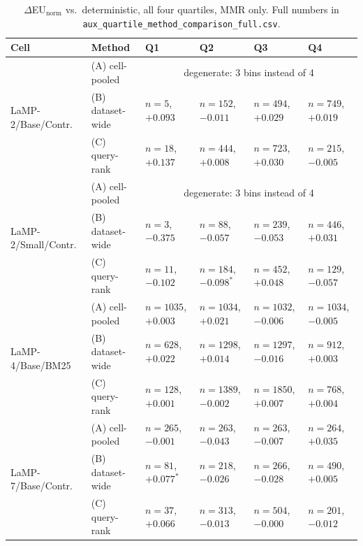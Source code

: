 \documentclass[10pt]{article}
\begin{document}
\begin{table}[h]
\centering
\scriptsize
\begin{tabular}{@{}llllll@{}}
\toprule
Cell & Method & Q1 & Q2 & Q3 & Q4 \\
\midrule
\multirow{3}{*}{LaMP-2/Base/Contr.} & (A) cell-pooled & \multicolumn{4}{c}{degenerate: 3 bins instead of 4} \\
 & (B) dataset-wide & $n{=}5$, $+0.093$ & $n{=}152$, $-0.011$ & $n{=}494$, $+0.029$ & $n{=}749$, $+0.019$ \\
 & (C) query-rank & $n{=}18$, $+0.137$ & $n{=}444$, $+0.008$ & $n{=}723$, $+0.030$ & $n{=}215$, $-0.005$ \\
\cmidrule(lr){1-6}
\multirow{3}{*}{LaMP-2/Small/Contr.} & (A) cell-pooled & \multicolumn{4}{c}{degenerate: 3 bins instead of 4} \\
 & (B) dataset-wide & $n{=}3$, $-0.375$ & $n{=}88$, $-0.057$ & $n{=}239$, $-0.053$ & $n{=}446$, $+0.031$ \\
 & (C) query-rank & $n{=}11$, $-0.102$ & $n{=}184$, $-0.098^{*}$ & $n{=}452$, $+0.048$ & $n{=}129$, $-0.057$ \\
\cmidrule(lr){1-6}
\multirow{3}{*}{LaMP-4/Base/BM25} & (A) cell-pooled & $n{=}1035$, $+0.003$ & $n{=}1034$, $+0.021$ & $n{=}1032$, $-0.006$ & $n{=}1034$, $-0.005$ \\
 & (B) dataset-wide & $n{=}628$, $+0.022$ & $n{=}1298$, $+0.014$ & $n{=}1297$, $-0.016$ & $n{=}912$, $+0.003$ \\
 & (C) query-rank & $n{=}128$, $+0.001$ & $n{=}1389$, $-0.002$ & $n{=}1850$, $+0.007$ & $n{=}768$, $+0.004$ \\
\cmidrule(lr){1-6}
\multirow{3}{*}{LaMP-7/Base/Contr.} & (A) cell-pooled & $n{=}265$, $-0.001$ & $n{=}263$, $-0.043$ & $n{=}263$, $-0.007$ & $n{=}264$, $+0.035$ \\
 & (B) dataset-wide & $n{=}81$, $+0.077^{*}$ & $n{=}218$, $-0.026$ & $n{=}266$, $-0.028$ & $n{=}490$, $+0.005$ \\
 & (C) query-rank & $n{=}37$, $+0.066$ & $n{=}313$, $-0.013$ & $n{=}504$, $-0.000$ & $n{=}201$, $-0.012$ \\
\bottomrule
\end{tabular}
\caption{$\Delta$EU$_{\text{norm}}$ vs.\ deterministic, all four quartiles, MMR
only. Full numbers in \texttt{aux\_quartile\_method\_comparison\_full.csv}.}
\label{tab:quartile-methods}
\end{table}
\end{document}
